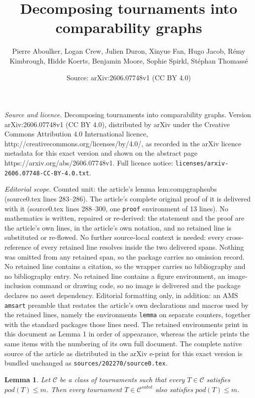 \documentclass[10pt,a4paper]{amsart}
\title{Decomposing tournaments into comparability graphs}
\author{Pierre Aboulker, Logan Crew, Julien Duron, Xinyue Fan, Hugo Jacob, R\'emy Kimbrough, Hidde Koerts, Benjamin Moore, Sophie Spirkl, St\'ephan Thomass\'e}
\date{Source: arXiv:2606.07748v1 (CC BY 4.0)}
\newtheorem{lemma}{Lemma}
\renewcommand{\le}{\leqslant}
\begin{document}
\maketitle

\noindent\emph{Source and licence.} Decomposing tournaments into comparability graphs. Version arXiv:2606.07748v1 (CC BY 4.0), distributed by arXiv under the Creative Commons Attribution 4.0 International licence, http://creativecommons.org/licenses/by/4.0/, as recorded in the arXiv licence metadata for this exact version and shown on the abstract page https://arxiv.org/abs/2606.07748v1. Full licence notice: \texttt{licenses/arxiv-2606.07748-CC-BY-4.0.txt}.\par\smallskip

\noindent\textit{Editorial scope.} Counted unit: the article's lemma lem:compgraphsubs (source0.tex lines 283--286). The article's complete original proof of it is delivered with it (source0.tex lines 288--300, one \texttt{proof} environment of 13 lines). No mathematics is written, repaired or re-derived: the statement and the proof are the article's own lines, in the article's own notation, and no retained line is substituted or re-flowed.  No further source-local context is needed: every cross-reference of every retained line resolves inside the two delivered spans.  Nothing was omitted from any retained span, so the package carries no omission record.  No retained line contains a citation, so the wrapper carries no bibliography and no bibliography entry.  No retained line contains a figure environment, an image-inclusion command or drawing code, so no image is delivered and the package declares no asset dependency.  Editorial formatting only, in addition: an AMS \texttt{amsart} preamble that restates the article's own declarations and macros used by the retained lines, namely the environments \texttt{lemma} on separate counters, together with the standard packages those lines need.  The retained environments print in this document as Lemma 1 in order of appearance, whereas the article prints the same items with the numbering of its own full document.  The complete native source of the article as distributed in the arXiv e-print for this exact version is bundled unchanged as \texttt{sources/202270/source0.tex}.
\begin{lemma}\label{lem:compgraphsubs}
Let $\mathcal{C}$ be a class of tournaments such that every $T\in\mathcal{C}$ satisfies $pod(T)\le m$.
Then every tournament $T\in\mathcal{C}^{subst}$ also satisfies $pod(T)\le m$.
\end{lemma}
\end{document}
